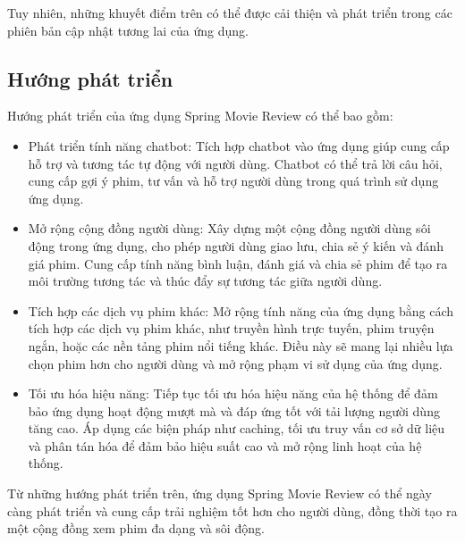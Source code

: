 \documentclass[12pt]{article}
\begin{document}
Tuy nhiên, những khuyết điểm trên có thể được cải thiện và phát triển trong các phiên bản cập nhật tương lai của ứng dụng.
\subsection{Hướng phát triển}
Hướng phát triển của ứng dụng Spring Movie Review có thể bao gồm:
\begin{itemize}
    \item Phát triển tính năng chatbot: Tích hợp chatbot vào ứng dụng giúp cung cấp hỗ trợ và tương tác tự động với người dùng. Chatbot có thể trả lời câu hỏi, cung cấp gợi ý phim, tư vấn và hỗ trợ người dùng trong quá trình sử dụng ứng dụng.

    
    \item Mở rộng cộng đồng người dùng: Xây dựng một cộng đồng người dùng sôi động trong ứng dụng, cho phép người dùng giao lưu, chia sẻ ý kiến và đánh giá phim. Cung cấp tính năng bình luận, đánh giá và chia sẻ phim để tạo ra môi trường tương tác và thúc đẩy sự tương tác giữa người dùng.

    \item Tích hợp các dịch vụ phim khác: Mở rộng tính năng của ứng dụng bằng cách tích hợp các dịch vụ phim khác, như truyền hình trực tuyến, phim truyện ngắn, hoặc các nền tảng phim nổi tiếng khác. Điều này sẽ mang lại nhiều lựa chọn phim hơn cho người dùng và mở rộng phạm vi sử dụng của ứng dụng.

    \item Tối ưu hóa hiệu năng: Tiếp tục tối ưu hóa hiệu năng của hệ thống để đảm bảo ứng dụng hoạt động mượt mà và đáp ứng tốt với tải lượng người dùng tăng cao. Áp dụng các biện pháp như caching, tối ưu truy vấn cơ sở dữ liệu và phân tán hóa để đảm bảo hiệu suất cao và mở rộng linh hoạt của hệ thống.
\end{itemize}
Từ những hướng phát triển trên, ứng dụng Spring Movie Review có thể ngày càng phát triển và cung cấp trải nghiệm tốt hơn cho người dùng, đồng thời tạo ra một cộng đồng xem phim đa dạng và sôi động.
\end{document}
